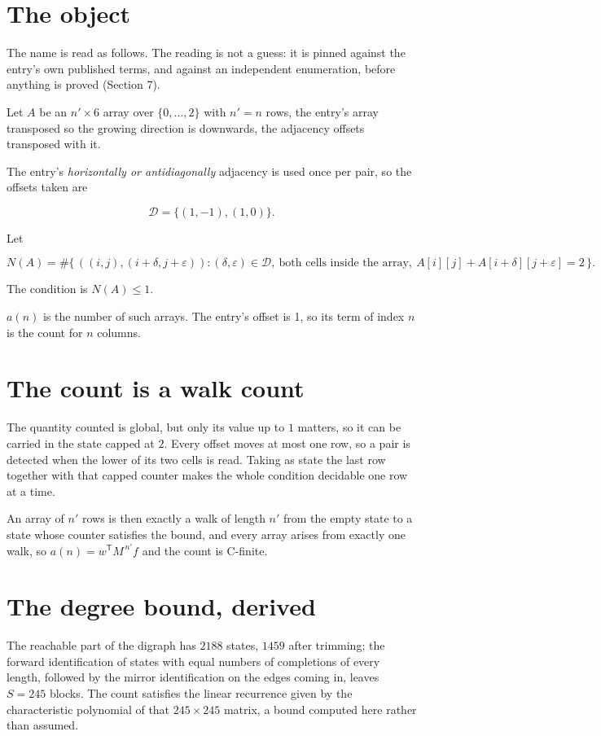 \documentclass[11pt]{article}
\theoremstyle{definition}
\begin{document}
\section{The object}

The name is read as follows. The reading is not a guess: it is pinned against the entry's own published terms, and against an independent enumeration, before anything is proved (Section 7).

Let $A$ be an $n' \times 6$ array over $\{0,\dots,2\}$ with $n' = n$ rows, the entry's array transposed so the growing direction is downwards, the adjacency offsets transposed with it.

The entry's {\itshape horizontally or antidiagonally} adjacency is used once per pair, so the offsets taken are

\[\mathcal{D} = \{(1,-1), (1,0)\}.\]

Let

\[N(A) = \#\bigl\{\,((i,j),(i{+}\delta,j{+}\varepsilon)) : (\delta,\varepsilon) \in \mathcal{D},\ \text{both cells inside the array},\ A[i][j] + A[i{+}\delta][j{+}\varepsilon] = 2\,\bigr\}.\]

The condition is $N(A) \le 1$.

$a(n)$ is the number of such arrays. The entry's offset is 1, so its term of index $n$ is the count for $n$ columns.

\section{The count is a walk count}

The quantity counted is global, but only its value up to $1$ matters, so it can be carried in the state capped at $2$. Every offset moves at most one row, so a pair is detected when the lower of its two cells is read. Taking as state the last row together with that capped counter makes the whole condition decidable one row at a time.

An array of $n'$ rows is then exactly a walk of length $n'$ from the empty state to a state whose counter satisfies the bound, and every array arises from exactly one walk, so $a(n) = w^{\mathsf T}M^{\,n'}f$ and the count is C-finite.

\section{The degree bound, derived}

The reachable part of the digraph has $2188$ states, $1459$ after trimming; the forward identification of states with equal numbers of completions of every length, followed by the mirror identification on the edges coming in, leaves $S = 245$ blocks. The count satisfies the linear recurrence given by the characteristic polynomial of that $245\times245$ matrix, a bound computed here rather than assumed.
\end{document}
